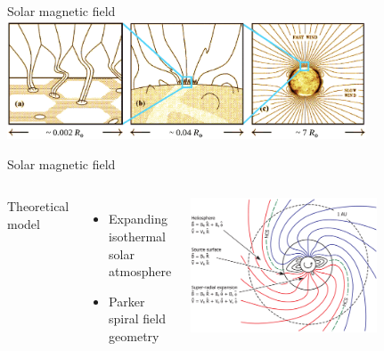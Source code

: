 \begin{frame}[plain,c]{Solar magnetic field}{}
	\centering
	\includegraphics[width=0.8\textwidth]{../figures_of_others/images/Cranmer2005_fig1_color.png}
\end{frame}
\begin{frame}[plain,c]{Solar magnetic field}{}
	\begin{columns}[c]
	\column{\textwidth}
	
		Theoretical model \citep{Parker1958}
		\begin{itemize}
			\item Expanding isothermal solar atmosphere
			\item Parker spiral field geometry
		\end{itemize}

		\centering
		\includegraphics[width=0.7\textwidth]{../figures_of_others/images/Owens2013_PFSS_Sectors_screenshot.png}
	
	\end{columns}
\end{frame}
